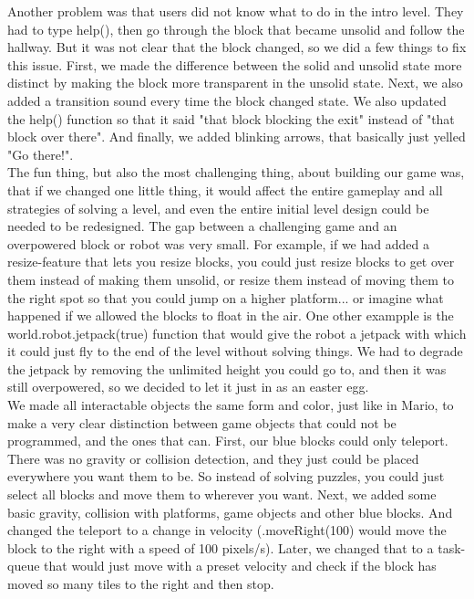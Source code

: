 \documentclass[a4paper,twoside,12pt]{article}
\begin{document}
Another problem was that users did not know what to do in the intro level. They had to type help(), then go through the block that became unsolid and follow the hallway. But it was not clear that the block changed, so we did a few things to fix this issue. First, we made the difference between the solid and unsolid state more distinct by making the block more transparent in the unsolid state. Next, we also added a transition sound every time the block changed state. We also updated the help() function so that it said "that block blocking the exit" instead of "that block over there". And finally, we added blinking arrows, that basically just yelled "Go there!".\\

The fun thing, but also the most challenging thing, about building our game was, that if we changed one little thing, it would affect the entire gameplay and all strategies of solving a level, and even the entire initial level design could be needed to be redesigned. The gap between a challenging game and an overpowered block or robot was very small. For example, if we had added a resize-feature that lets you resize blocks, you could just resize blocks to get over them instead of making them unsolid, or resize them instead of moving them to the right spot so that you could jump on a higher platform... or imagine what happened if we allowed the blocks to float in the air. One other exampple is the world.robot.jetpack(true) function that would give the robot a jetpack with which it could just fly to the end of the level without solving things. We had to degrade the jetpack by removing the unlimited height you could go to, and then it was still overpowered, so we decided to let it just in as an easter egg.\\

We made all interactable objects the same form and color, just like in Mario, to make a very clear distinction between game objects that could not be programmed, and the ones that can. First, our blue blocks could only teleport. There was no gravity or collision detection, and they just could be placed everywhere you want them to be. So instead of solving puzzles, you could just select all blocks and move them to wherever you want. Next, we added some basic gravity, collision with platforms, game objects and other blue blocks. And changed the teleport to a change in velocity (.moveRight(100) would move the block to the right with a speed of 100 pixels/s). Later, we changed that to a task-queue that would just move with a preset velocity and check if the block has moved so many tiles to the right and then stop.\\
\end{document}
